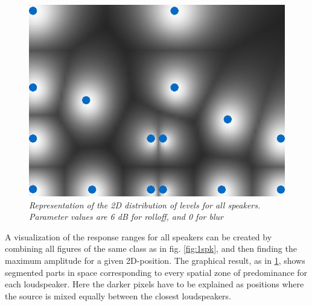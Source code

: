 \documentclass[twoside,10pt]{article}
\begin{document}

\begin{figure}[ht]
\centerline{\includegraphics[scale=0.5]{all_r_6_b_0}}
\caption{{\it Representation of the 2D distribution of levels for all speakers. Parameter values are 6 dB for rolloff, and 0 for blur}}  
\label{fig:allspk2}
\end{figure}


A visualization of the response ranges for all speakers can be created by combining all figures of the same class as in fig. \ref{fig:1spk}, and then finding the maximum amplitude for a given 2D-position. The graphical result, as in \ref{fig:allspk2}, shows segmented parts in space corresponding to every spatial zone of predominance for each loudspeaker. Here the darker pixels have to be explained as positions where the source is mixed equally between the closest loudspeakers. %
\end{document}

